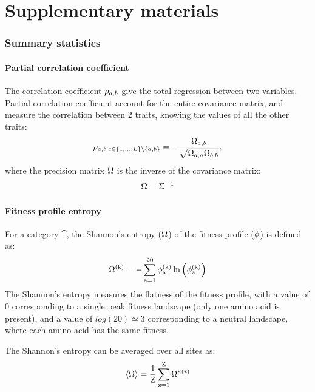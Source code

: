 \documentclass{article}
\begin{document}
	\part*{Supplementary materials}
	\tableofcontents
	\section{Summary statistics}
	\label{sec:summary-statistics}

	\subsection{Partial correlation coefficient}
	\label{subsec:partial-correlation-coefficient}

	The correlation coefficient $\rho_{a, b}$ give the total regression between two variables.
	Partial-correlation coefficient account for the entire covariance matrix, and measure the correlation between $2$ traits, knowing the values of all the other traits:
	\begin{equation}
		\rho_{a, b | c \in \{1, \hdots, L\} \setminus \{ a, b\} } = - \dfrac{\Omega_{a, b}}{\sqrt{\Omega_{a, a} \Omega_{b, b}}},
	\end{equation}
	where the precision matrix $\Omega$ is the inverse of the covariance matrix:
	\begin{equation}
		\Omega = \Sigma^{-1}
	\end{equation}

	\subsection{Fitness profile entropy}
	\label{subsec:fitness-profile-entropy}

	For a category $\cat$, the Shannon's entropy (${\Omega}$) of the fitness profile ($\phi$) is defined as:
	\begin{equation}
		{\Omega}^{(\text{k})} = - \sum\limits_{\text{a}=1}^{20} \phi^{(\text{k})}_{\text{a}} \ln \left( \phi^{(\text{k})}_{\text{a}} \right)
	\end{equation}
	The Shannon's entropy measures the flatness of the fitness profile, with a value of $0$ corresponding to a single peak fitness landscape (only one amino acid is present), and a value of $log(20)\simeq3$ corresponding to a {neutral} landscape, where each amino acid has the same fitness.

	The Shannon's entropy can be averaged over all sites as:
	\begin{equation}
		\left\langle {\Omega} \right\rangle = \dfrac{1}{\text{Z}}\sum\limits_{\text{z}=1}^{\text{Z}} {\Omega}^{\kappa\left(\text{z}\right)}
	\end{equation}
\end{document}
